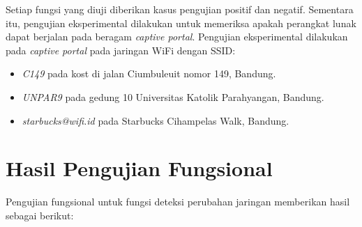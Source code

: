 Setiap fungsi yang diuji diberikan kasus pengujian positif dan negatif. Sementara itu, pengujian eksperimental dilakukan untuk memeriksa apakah perangkat lunak dapat berjalan pada beragam \textit{captive portal}. Pengujian eksperimental dilakukan pada \textit{captive portal} pada jaringan WiFi dengan SSID:

\begin{itemize}
    \item{\textit{C149} pada kost di jalan Ciumbuleuit nomor 149, Bandung.}
    \item{\textit{UNPAR9} pada gedung 10 Universitas Katolik Parahyangan, Bandung.}
    \item{\textit{starbucks@wifi.id} pada Starbucks Cihampelas Walk, Bandung.}
\end{itemize}



\section{Hasil Pengujian Fungsional}
\label{sec:hasil_fungsional}

Pengujian fungsional untuk fungsi deteksi perubahan jaringan memberikan hasil sebagai berikut:

